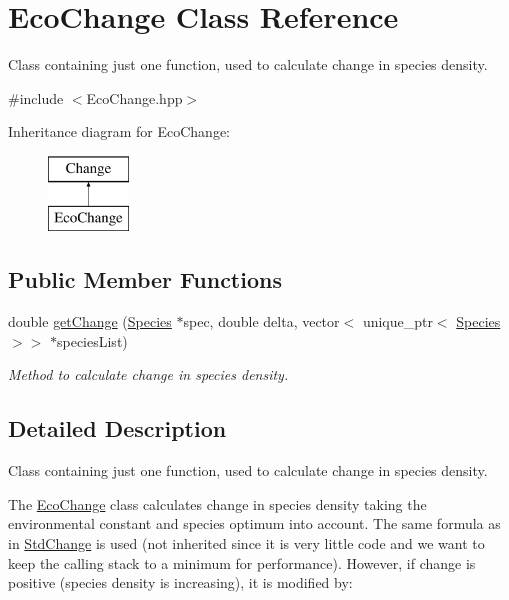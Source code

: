 \hypertarget{classEcoChange}{}\section{Eco\+Change Class Reference}
\label{classEcoChange}


Class containing just one function, used to calculate change in species density.  




{\ttfamily \#include $<$Eco\+Change.\+hpp$>$}

Inheritance diagram for Eco\+Change\+:\begin{figure}[H]
\begin{center}
\leavevmode
\includegraphics[height=2.000000cm]{classEcoChange}
\end{center}
\end{figure}
\subsection*{Public Member Functions}
\begin{DoxyCompactItemize}
\item 
double \hyperlink{classEcoChange_a963a6e9a77b2c7df7cf25bb8931dbe5c}{get\+Change} (\hyperlink{classSpecies}{Species} $\ast$spec, double delta, vector$<$ unique\+\_\+ptr$<$ \hyperlink{classSpecies}{Species} $>$$>$ $\ast$species\+List)
\begin{DoxyCompactList}\small\item\em Method to calculate change in species density. \end{DoxyCompactList}\end{DoxyCompactItemize}


\subsection{Detailed Description}
Class containing just one function, used to calculate change in species density. 

The \hyperlink{classEcoChange}{Eco\+Change} class calculates change in species density taking the environmental constant and species optimum into account. The same formula as in \hyperlink{classStdChange}{Std\+Change} is used (not inherited since it is very little code and we want to keep the calling stack to a minimum for performance). However, if change is positive (species density is increasing), it is modified by\+:

